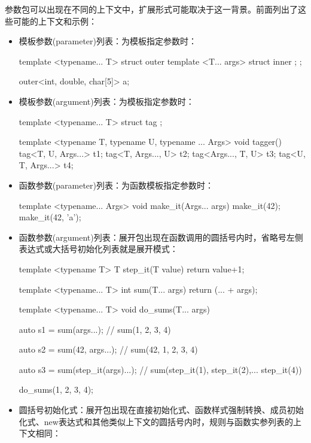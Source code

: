 参数包可以出现在不同的上下文中，扩展形式可能取决于这一背景。前面列出了这些可能的上下文和示例：

\begin{itemize}
\item
模板参数(parameter)列表：为模板指定参数时：

\begin{cpp}
template <typename... T>
struct outer
{
	template <T... args>
	struct inner {};
};

outer<int, double, char[5]> a;
\end{cpp}

\item
模板参数(argument)列表：为模板指定参数时：

\begin{cpp}
template <typename... T>
struct tag {};

template <typename T, typename U, typename ... Args>
void tagger()
{
	tag<T, U, Args...> t1;
	tag<T, Args..., U> t2;
	tag<Args..., T, U> t3;
	tag<U, T, Args...> t4;
}
\end{cpp}

\item
函数参数(parameter)列表：为函数模板指定参数时：

\begin{cpp}
template <typename... Args>
void make_it(Args... args)
{ }
make_it(42);
make_it(42, 'a');
\end{cpp}

\item
函数参数(argument)列表：展开包出现在函数调用的圆括号内时，省略号左侧表达式或大括号初始化列表就是展开模式：

\begin{cpp}
template <typename T>
T step_it(T value)
{
	return value+1;
}

template <typename... T>
int sum(T... args)
{
	return (... + args);
}

template <typename... T>
void do_sums(T... args)
{
	auto s1 = sum(args...);
	// sum(1, 2, 3, 4)
	
	auto s2 = sum(42, args...);
	// sum(42, 1, 2, 3, 4)
	
	auto s3 = sum(step_it(args)...);
	// sum(step_it(1), step_it(2),... step_it(4))
}

do_sums(1, 2, 3, 4);
\end{cpp}

\item
圆括号初始化式：展开包出现在直接初始化式、函数样式强制转换、成员初始化式、new表达式和其他类似上下文的圆括号内时，规则与函数实参列表的上下文相同：


\end{itemize}
